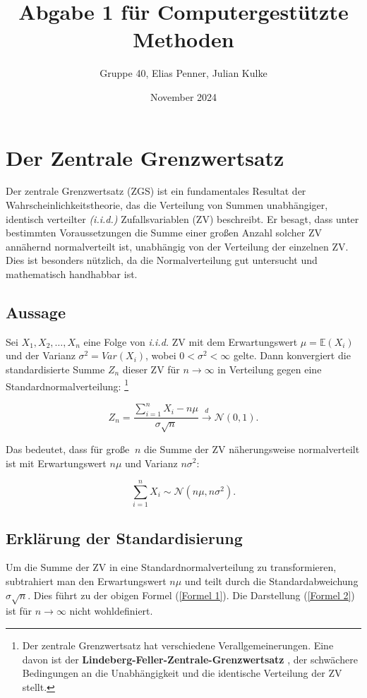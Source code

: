 \documentclass[a4paper, 12pt]{article}
\title{Abgabe 1 für Computergestützte Methoden}
\author{Gruppe 40, Elias Penner, Julian Kulke}
\date{November 2024}
\begin{document}
\maketitle

\tableofcontents
\newpage

\section{Der Zentrale Grenzwertsatz}
Der zentrale Grenzwertsatz (ZGS) ist ein fundamentales Resultat der Wahrscheinlichkeitstheorie, das die Verteilung von Summen unabhängiger, identisch
verteilter \textit{(i.i.d.)} Zufallsvariablen (ZV) beschreibt. Er besagt, dass unter bestimmten Voraussetzungen die Summe einer großen Anzahl solcher ZV annähernd
normalverteilt ist, unabhängig von der Verteilung der einzelnen ZV. Dies ist besonders nützlich, da die Normalverteilung gut untersucht und mathematisch handhabbar ist.

\subsection{Aussage}
Sei \(X_1, X_2,\ldots, X_n\) eine Folge von \textit{i.i.d.} ZV mit dem Erwartungswert $\mu = \mathbb{E}(X_i)$ und der Varianz \(\sigma^2 =Var(X_i) \), wobei \(0< \sigma^2 < \infty\) gelte. Dann konvergiert die standardisierte Summe \(Z_n\) dieser ZV für \(n \rightarrow \infty\) in Verteilung gegen eine
Standardnormalverteilung:
\footnote{Der zentrale Grenzwertsatz hat verschiedene Verallgemeinerungen. Eine davon ist der \textbf{Lindeberg-Feller-Zentrale-Grenzwertsatz} \cite[Seite 328]{Wahrscheinlichkeitstheorie_Achim_Klenke}, der schwächere Bedingungen an
die Unabhängigkeit und die identische Verteilung der ZV stellt.}


\[Z_n = \frac{\sum_{i=1}^n X_i-n\mu}{\sigma \sqrt{n}} \xrightarrow{d} \mathcal{N}(0, 1). \tag{1} \label{Formel 1}\]


Das bedeutet, dass für große \(\ n\) die Summe der ZV näherungsweise normalverteilt
ist mit Erwartungswert \(n\mu\) und Varianz \(n\sigma^2\):

\[\sum_{i=1}^n X_i \sim \mathcal{N}(n\mu, n\sigma^2). \tag{2} \label{Formel 2}\]

\subsection{Erklärung der Standardisierung}
Um die Summe der ZV in eine Standardnormalverteilung zu transformieren, subtrahiert man den Erwartungswert \(n\mu\) und teilt durch die Standardabweichung \(\sigma \sqrt{n}\). Dies führt zu der obigen Formel (\ref{Formel 1}). Die Darstellung (\ref{Formel 2}) ist für \(n \rightarrow \infty\) nicht wohldefiniert.
\end{document}

